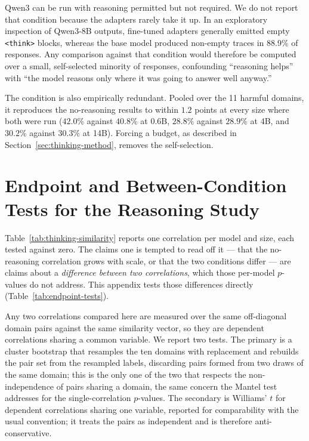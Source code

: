 \documentclass{article}
\begin{document}
Qwen3 can be run with reasoning permitted but not required. We do not report that condition
because the adapters rarely take it up. In an exploratory inspection of Qwen3-8B outputs,
fine-tuned adapters generally emitted empty \texttt{<think>} blocks, whereas the base model
produced non-empty traces in 88.9\% of responses. Any comparison against that condition would
therefore be computed over a small, self-selected minority of responses, confounding
``reasoning helps'' with ``the model reasons only where it was going to answer well anyway.''

The condition is also empirically redundant. Pooled over the 11 harmful domains, it
reproduces the no-reasoning results to within $1.2$ points at every size where both were run
($42.0\%$ against $40.8\%$ at 0.6B, $28.8\%$ against $28.9\%$ at 4B, and $30.2\%$ against
$30.3\%$ at 14B). Forcing a budget, as described in Section~\ref{sec:thinking-method},
removes the self-selection.

\section{Endpoint and Between-Condition Tests for the Reasoning Study}
\label{app:endpoint-tests}

Table~\ref{tab:thinking-similarity} reports one correlation per model and size, each tested
against zero. The claims one is tempted to read off it --- that the no-reasoning correlation
grows with scale, or that the two conditions differ --- are claims about a \emph{difference between
two correlations}, which those per-model $p$-values do not address. This appendix tests those
differences directly (Table~\ref{tab:endpoint-tests}).

Any two correlations compared here are measured over the same off-diagonal domain pairs
against the same similarity vector, so they are dependent correlations sharing a common
variable. We report two tests. The primary is a cluster bootstrap that resamples the ten
domains with replacement and rebuilds the pair set from the resampled labels, discarding pairs
formed from two draws of the same domain; this is the only one of the two that respects the
non-independence of pairs sharing a domain, the same concern the Mantel test addresses for the
single-correlation $p$-values. The secondary is Williams' $t$ for dependent correlations
sharing one variable, reported for comparability with the usual convention; it treats the
pairs as independent and is therefore anti-conservative.
\end{document}
